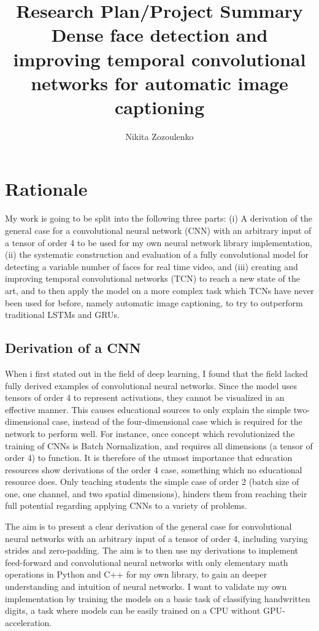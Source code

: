 \documentclass[a4paper, twoside]{article}
\title{\huge{\textbf{Research Plan/Project Summary}\\}
\Large{Dense face detection and improving temporal convolutional networks for automatic image captioning}}
\author{Nikita Zozoulenko}
\begin{document}
\maketitle

\newpage
\section{Rationale}
My work is going to be split into the following three parts: (i) A derivation of the general case for a convolutional neural network (CNN) with an arbitrary input of a tensor of order 4 to be used for my own neural network library implementation, (ii) the systematic construction and evaluation of a fully convolutional model for detecting a variable number of faces for real time video, and (iii) creating and improving temporal convolutional networks (TCN) to reach a new state of the art, and to then apply the model on a more complex task which TCNs have never been used for before, namely automatic image captioning, to try to outperform traditional LSTMs and GRUs.

\subsection{Derivation of a CNN}
When i first stated out in the field of deep learning, I found that the field lacked fully derived examples of convolutional neural networks. Since the model uses tensors of order 4 to represent activations, they cannot be visualized in an effective manner. This causes educational sources to only explain the simple two-dimensional case, instead of the four-dimensional case which is required for the network to perform well. For instance, once concept which revolutionized the training of CNNs is Batch Normalization, and requires all dimensions (a tensor of order 4) to function. It is therefore of the utmost importance that education resources show derivations of the order 4 case, something which no educational resource does. Only teaching students the simple case of order 2 (batch size of one, one channel, and two spatial dimensions), hinders them from reaching their full potential regarding applying CNNs to a variety of problems.

The aim is to present a clear derivation of the general case for convolutional neural networks with an arbitrary input of a tensor of order 4, including varying strides and zero-padding. The aim is to then use my derivations to implement feed-forward and convolutional neural networks with only elementary math operations in Python and C++ for my own library, to gain an deeper understanding and intuition of neural networks. I want to validate my own implementation by training the models on a basic task of classifying handwritten digits, a task where models can be easily trained on a CPU without GPU-acceleration.
\end{document}
